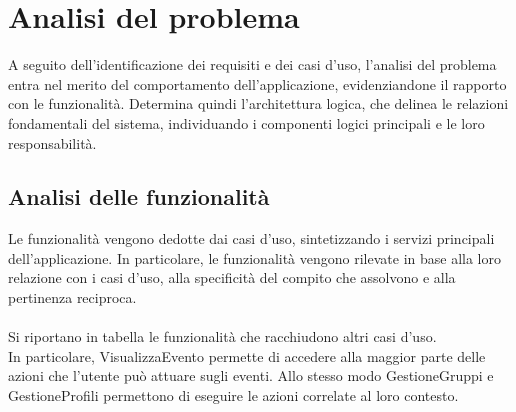 \section{Analisi del problema}

A seguito dell'identificazione dei requisiti e dei casi d'uso,
l'analisi del problema entra nel merito del comportamento dell'applicazione,
evidenziandone il rapporto con le funzionalità.
Determina quindi l'architettura logica, che delinea le relazioni fondamentali del sistema,
individuando i componenti logici principali e le loro responsabilità.\\

\subsection{Analisi delle funzionalità}

Le funzionalità vengono dedotte dai casi d'uso, sintetizzando i servizi principali dell'applicazione.
In particolare, le funzionalità vengono rilevate in base alla loro relazione con i casi d'uso,
alla specificità del compito che assolvono e alla pertinenza reciproca.\\
\\
Si riportano in tabella le funzionalità che racchiudono altri casi d'uso.\\
In particolare, VisualizzaEvento permette di accedere alla maggior parte delle azioni
che l'utente può attuare sugli eventi.
Allo stesso modo GestioneGruppi e GestioneProfili
permettono di eseguire le azioni correlate al loro contesto.\\

